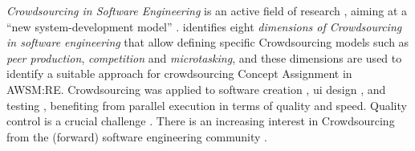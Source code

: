
\vspace{-5pt}
\emph{\gls{Crowdsourcing} in Software Engineering} is an active field of research \autocite{Mao2017,Latoza2016}, aiming at a ``new system-development model'' \autocite{Kazman2009}.
\citet{Latoza2016} identifies eight \emph{dimensions of \gls{Crowdsourcing} in software engineering} that allow defining specific \gls{Crowdsourcing} models such as \emph{peer production}, \emph{competition} and \emph{microtasking}, and these dimensions are used to identify a suitable approach for crowdsourcing \gls{Concept Assignment} in AWSM:RE.
\gls{Crowdsourcing} was applied to software creation \autocite{Satzger2014,Nebeling2012}, \gls{ui} design  \autocite{Weidema2016CrowdDesign,Nebeling2013CrowdAdapt}, and testing \autocite{Stol2014}, benefiting from parallel execution in terms of quality and speed.
Quality control is a crucial challenge
\autocite{Daniel2018CrowdsourcingQuality,Allahbakhsh2013}.
There is an increasing interest in \gls{Crowdsourcing} from the (forward) software engineering community  \autocite{Mao2017}.

